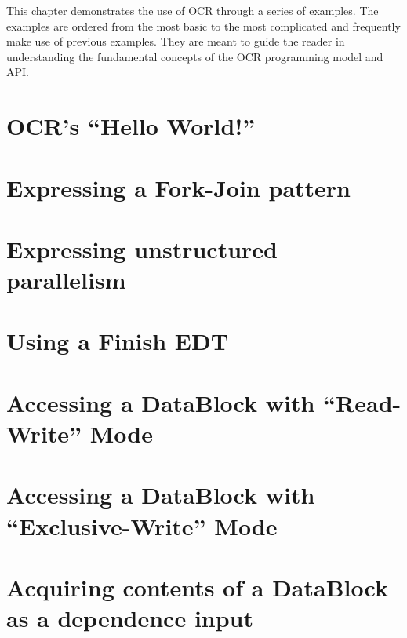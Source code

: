 This chapter demonstrates the use of OCR through a series of
examples. The examples are ordered from the most basic to the most
complicated and frequently make use of previous examples. They are
meant to guide the reader in understanding the fundamental concepts of
the OCR programming model and API.

\section{OCR's ``Hello World!''}

\section{Expressing a Fork-Join pattern}

\section{Expressing unstructured parallelism}

\section{Using a Finish EDT}

\section{Accessing a DataBlock with ``Read-Write'' Mode}

\section{Accessing a DataBlock with ``Exclusive-Write'' Mode}

\section{Acquiring contents of a DataBlock as a dependence input}

